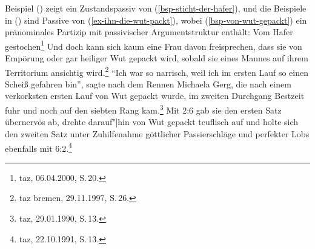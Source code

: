 \noindent
Beispiel () zeigt ein Zustandspassiv von (\ref{bsp-sticht-der-hafer}), und die Beispiele in
() sind Passive von (\ref{ex-ihn-die-wut-packt}), wobei (\ref{bsp-von-wut-gepackt}) ein
pränominales Partizip mit passivischer Argumentstruktur enthält: 
\ea
Vom Hafer gestochen\footnote{
  taz, 06.04.2000, S.\,20.
}
\z
\eal
\label{wut-gepackt}
\ex Und doch kann sich kaum eine Frau davon freisprechen, dass sie von Empörung oder gar heiliger Wut gepackt wird, sobald sie eines Mannes auf ihrem Territorium ansichtig wird.\footnote{
  taz bremen, 29.11.1997, S.\,26.
}
\ex "`Ich war so narrisch, weil ich im ersten Lauf so einen Scheiß gefahren bin"', 
    sagte nach dem Rennen Michaela Gerg, die nach einem verkorksten ersten Lauf von Wut gepackt wurde, 
    im zweiten Durchgang Bestzeit fuhr und noch auf den siebten Rang kam.\footnote{
      taz, 29.01.1990, S.\,13.
    }
\ex\label{bsp-von-wut-gepackt}
Mit 2:6 gab sie den ersten Satz übernervös ab, drehte darauf"|hin von Wut gepackt teuflisch auf und holte sich den zweiten Satz unter Zuhilfenahme göttlicher Passierschläge und perfekter Lobs ebenfalls mit 6:2.\footnote{
  taz, 22.10.1991, S.\,13.
}
\zl

